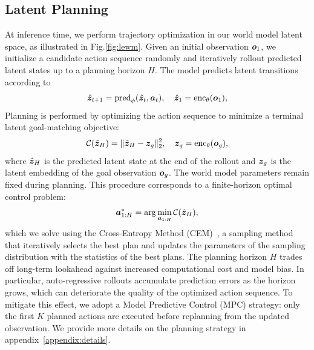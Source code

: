 \subsection{Latent Planning}

At inference time, we perform trajectory optimization in our world model latent space, as illustrated in Fig.\ref{fig:lewm}. Given an initial observation ${\bm{o}}_1$, we initialize a candidate action sequence randomly and iteratively rollout predicted latent states up to a planning horizon $H$. The model predicts latent transitions according to
\begin{equation*}
\hat{{\bm{z}}}_{t+1} = {\rm pred}_\phi(\hat{{\bm{z}}}_t, {\bm{a}}_t), \quad
\hat{{\bm{z}}}_1 = {\rm enc}_\theta({\bm{o}}_1),
\end{equation*}
Planning is performed by optimizing the action sequence to minimize a terminal latent goal-matching objective:
\begin{equation}
{\mathcal{C}}(\hat{{\bm{z}}}_H) = \| \hat{{\bm{z}}}_H - {\bm{z}}_g \|_2^2, \quad
{\bm{z}}_g = {\rm enc}_\theta({\bm{o}}_g),
\end{equation}
where $\hat{{\bm{z}}}_H$ is the predicted latent state at the end of the rollout and ${\bm{z}}_g$ is the latent embedding of the goal observation ${\bm{o}}_g$. The world model parameters remain fixed during planning. This procedure corresponds to a finite-horizon optimal control problem:
\begin{equation}
{\bm{a}}^*_{1:H} = \arg\min_{{\bm{a}}_{1:H}} {\mathcal{C}}(\hat{{\bm{z}}}_H),
\label{eq:argmin_plan}
\end{equation}
which we solve using the Cross-Entropy Method (CEM)~\cite{rubinstein2004cross}, a sampling method that iteratively selects the best plan and updates the parameters of the sampling distribution with the statistics of the best plans. The planning horizon $H$ trades off long-term lookahead against increased computational cost and model bias. In particular, auto-regressive rollouts accumulate prediction errors as the horizon grows, which can deteriorate the quality of the optimized action sequence. To mitigate this effect, we adopt a Model Predictive Control (MPC) strategy: only the first $K$ planned actions are executed before replanning from the updated observation.
We provide more details on the planning strategy in appendix~\ref{appendix:details}.
